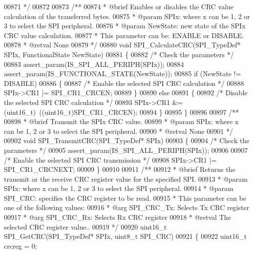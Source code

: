 \begin{DoxyCode}
00871 \textcolor{comment}{  */}
00872 
00873 \textcolor{comment}{/**}
00874 \textcolor{comment}{  * @brief  Enables or disables the CRC value calculation of the transferred bytes.}
00875 \textcolor{comment}{  * @param  SPIx: where x can be 1, 2 or 3 to select the SPI peripheral.}
00876 \textcolor{comment}{  * @param  NewState: new state of the SPIx CRC value calculation.}
00877 \textcolor{comment}{  *          This parameter can be: ENABLE or DISABLE.}
00878 \textcolor{comment}{  * @retval None}
00879 \textcolor{comment}{  */}
00880 \textcolor{keywordtype}{void} SPI_CalculateCRC(SPI\_TypeDef* SPIx, FunctionalState NewState)
00881 \{
00882   \textcolor{comment}{/* Check the parameters */}
00883   assert_param(IS\_SPI\_ALL\_PERIPH(SPIx));
00884   assert_param(IS\_FUNCTIONAL\_STATE(NewState));
00885   \textcolor{keywordflow}{if} (NewState != DISABLE)
00886   \{
00887     \textcolor{comment}{/* Enable the selected SPI CRC calculation */}
00888     SPIx->CR1 |= SPI_CR1_CRCEN;
00889   \}
00890   \textcolor{keywordflow}{else}
00891   \{
00892     \textcolor{comment}{/* Disable the selected SPI CRC calculation */}
00893     SPIx->CR1 &= (uint16\_t)~((uint16\_t)SPI_CR1_CRCEN);
00894   \}
00895 \}
00896 
00897 \textcolor{comment}{/**}
00898 \textcolor{comment}{  * @brief  Transmit the SPIx CRC value.}
00899 \textcolor{comment}{  * @param  SPIx: where x can be 1, 2 or 3 to select the SPI peripheral.}
00900 \textcolor{comment}{  * @retval None}
00901 \textcolor{comment}{  */}
00902 \textcolor{keywordtype}{void} SPI_TransmitCRC(SPI\_TypeDef* SPIx)
00903 \{
00904   \textcolor{comment}{/* Check the parameters */}
00905   assert_param(IS\_SPI\_ALL\_PERIPH(SPIx));
00906 
00907   \textcolor{comment}{/* Enable the selected SPI CRC transmission */}
00908   SPIx->CR1 |= SPI_CR1_CRCNEXT;
00909 \}
00910 
00911 \textcolor{comment}{/**}
00912 \textcolor{comment}{  * @brief  Returns the transmit or the receive CRC register value for the specified SPI.}
00913 \textcolor{comment}{  * @param  SPIx: where x can be 1, 2 or 3 to select the SPI peripheral.}
00914 \textcolor{comment}{  * @param  SPI\_CRC: specifies the CRC register to be read.}
00915 \textcolor{comment}{  *          This parameter can be one of the following values:}
00916 \textcolor{comment}{  *            @arg SPI\_CRC\_Tx: Selects Tx CRC register}
00917 \textcolor{comment}{  *            @arg SPI\_CRC\_Rx: Selects Rx CRC register}
00918 \textcolor{comment}{  * @retval The selected CRC register value..}
00919 \textcolor{comment}{  */}
00920 uint16\_t SPI_GetCRC(SPI\_TypeDef* SPIx, uint8\_t SPI\_CRC)
00921 \{
00922   uint16\_t crcreg = 0;

\end{DoxyCode}
